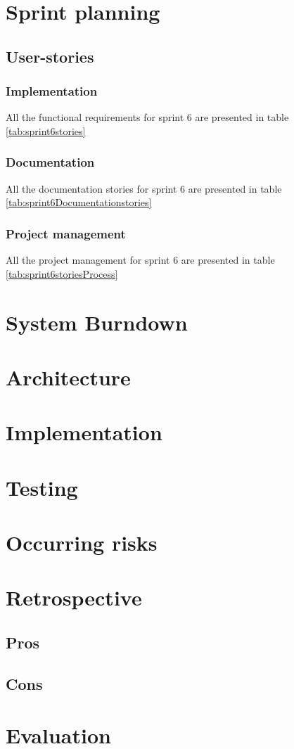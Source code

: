 \section{Sprint planning}
\subsection{User-stories}
\subsubsection*{Implementation}
All the functional requirements for sprint 6 are presented in table \ref{tab:sprint6stories}

\subsubsection*{Documentation}
All the documentation stories for sprint 6 are presented in table \ref{tab:sprint6Documentationstories}

\subsubsection*{Project management}
All the project management for sprint 6 are presented in table \ref{tab:sprint6storiesProcess}
\section{System Burndown}
\section{Architecture}
\section{Implementation}
\section{Testing}
\section{Occurring risks}
\section{Retrospective}
\subsection{Pros}
\subsection{Cons}
\section{Evaluation}